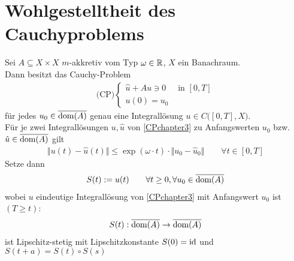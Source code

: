 
\chapter{Wohlgestelltheit des Cauchyproblems} %
\setcounter{section}{1}
\begin{theorem}\label{theoremCrandall-Liggett}\enter
Sei $A\subseteq X\times X$ $m$-akkretiv vom Typ $\omega\in\mathbb{R}$, $X$ ein Banachraum.\\
Dann besitzt das Cauchy-Problem
\begin{align}\label{CPchapter3}\tag{CP}
\text{(CP)}\left\lbrace\begin{array}{rl}
\hat{u}+Au\ni 0&\text{ in }[0,T]\\
u(0)=u_0&
\end{array}\right.
\end{align}
für jedes $u_0\in\overline{\text{dom}(A)}$ genau eine Integrallösung $u\in C\big([0,T],X\big)$.\\
Für je zwei Integrallösungen $u,\hat{u}$ von \eqref{CPchapter3} zu Anfangswerten $u_0$ bzw. $\hat{u}\in\overline{\text{dom}(A)}$ gilt
\begin{align*}
\big\Vert u(t)-\hat{u}(t)\big\Vert
\leq\exp(\omega\cdot t)\cdot\big\Vert u_0-\hat{u}_0\big\Vert\qquad\forall t\in[0,T]
\end{align*}
Setze dann
\begin{align*}
S(t):=u(t)\qquad\forall t\geq0,\forall u_0\in\overline{\text{dom}(A)}
\end{align*}
wobei $u$ eindeutige Integrallösung von \eqref{CPchapter3} mit Anfangswert $u_0$ ist $(T\geq t)$:
\begin{align*}
S(t):\overline{\text{dom}(A)}\to\overline{\text{dom}(A)}
\end{align*}
ist Lipschitz-stetig mit Lipschitzkonstante $S(0)=\text{id}$ und $S(t+a)=S(t)\circ S(s)$
\end{theorem}